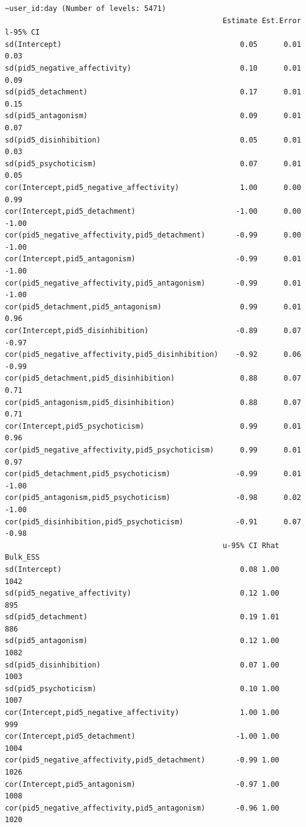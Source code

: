 \documentclass[
  11pt,
  a4paper,
  onecolumn]{article}
\begin{document}
\begin{verbatim}
~user_id:day (Number of levels: 5471) 
                                                  Estimate Est.Error l-95% CI
sd(Intercept)                                         0.05      0.01     0.03
sd(pid5_negative_affectivity)                         0.10      0.01     0.09
sd(pid5_detachment)                                   0.17      0.01     0.15
sd(pid5_antagonism)                                   0.09      0.01     0.07
sd(pid5_disinhibition)                                0.05      0.01     0.03
sd(pid5_psychoticism)                                 0.07      0.01     0.05
cor(Intercept,pid5_negative_affectivity)              1.00      0.00     0.99
cor(Intercept,pid5_detachment)                       -1.00      0.00    -1.00
cor(pid5_negative_affectivity,pid5_detachment)       -0.99      0.00    -1.00
cor(Intercept,pid5_antagonism)                       -0.99      0.01    -1.00
cor(pid5_negative_affectivity,pid5_antagonism)       -0.99      0.01    -1.00
cor(pid5_detachment,pid5_antagonism)                  0.99      0.01     0.96
cor(Intercept,pid5_disinhibition)                    -0.89      0.07    -0.97
cor(pid5_negative_affectivity,pid5_disinhibition)    -0.92      0.06    -0.99
cor(pid5_detachment,pid5_disinhibition)               0.88      0.07     0.71
cor(pid5_antagonism,pid5_disinhibition)               0.88      0.07     0.71
cor(Intercept,pid5_psychoticism)                      0.99      0.01     0.96
cor(pid5_negative_affectivity,pid5_psychoticism)      0.99      0.01     0.97
cor(pid5_detachment,pid5_psychoticism)               -0.99      0.01    -1.00
cor(pid5_antagonism,pid5_psychoticism)               -0.98      0.02    -1.00
cor(pid5_disinhibition,pid5_psychoticism)            -0.91      0.07    -0.98
                                                  u-95% CI Rhat Bulk_ESS
sd(Intercept)                                         0.08 1.00     1042
sd(pid5_negative_affectivity)                         0.12 1.00      895
sd(pid5_detachment)                                   0.19 1.01      886
sd(pid5_antagonism)                                   0.12 1.00     1082
sd(pid5_disinhibition)                                0.07 1.00     1003
sd(pid5_psychoticism)                                 0.10 1.00     1007
cor(Intercept,pid5_negative_affectivity)              1.00 1.00      999
cor(Intercept,pid5_detachment)                       -1.00 1.00     1004
cor(pid5_negative_affectivity,pid5_detachment)       -0.99 1.00     1026
cor(Intercept,pid5_antagonism)                       -0.97 1.00     1008
cor(pid5_negative_affectivity,pid5_antagonism)       -0.96 1.00     1020

\end{verbatim}
\end{document}
